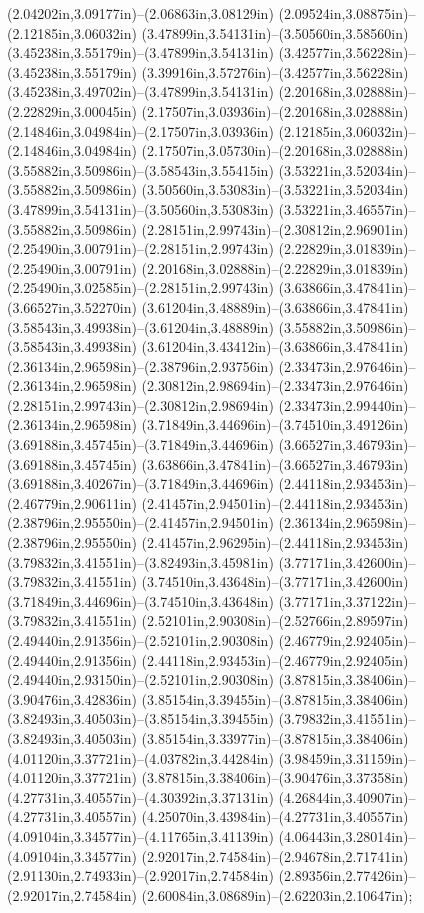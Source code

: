 (2.04202in,3.09177in)--(2.06863in,3.08129in) (2.09524in,3.08875in)--(2.12185in,3.06032in) (3.47899in,3.54131in)--(3.50560in,3.58560in) (3.45238in,3.55179in)--(3.47899in,3.54131in) (3.42577in,3.56228in)--(3.45238in,3.55179in) (3.39916in,3.57276in)--(3.42577in,3.56228in) (3.45238in,3.49702in)--(3.47899in,3.54131in) (2.20168in,3.02888in)--(2.22829in,3.00045in) (2.17507in,3.03936in)--(2.20168in,3.02888in) (2.14846in,3.04984in)--(2.17507in,3.03936in) (2.12185in,3.06032in)--(2.14846in,3.04984in) (2.17507in,3.05730in)--(2.20168in,3.02888in) (3.55882in,3.50986in)--(3.58543in,3.55415in) (3.53221in,3.52034in)--(3.55882in,3.50986in) (3.50560in,3.53083in)--(3.53221in,3.52034in) (3.47899in,3.54131in)--(3.50560in,3.53083in) (3.53221in,3.46557in)--(3.55882in,3.50986in) (2.28151in,2.99743in)--(2.30812in,2.96901in) (2.25490in,3.00791in)--(2.28151in,2.99743in) (2.22829in,3.01839in)--(2.25490in,3.00791in) (2.20168in,3.02888in)--(2.22829in,3.01839in) (2.25490in,3.02585in)--(2.28151in,2.99743in) (3.63866in,3.47841in)--(3.66527in,3.52270in) (3.61204in,3.48889in)--(3.63866in,3.47841in) (3.58543in,3.49938in)--(3.61204in,3.48889in) (3.55882in,3.50986in)--(3.58543in,3.49938in) (3.61204in,3.43412in)--(3.63866in,3.47841in) (2.36134in,2.96598in)--(2.38796in,2.93756in) (2.33473in,2.97646in)--(2.36134in,2.96598in) (2.30812in,2.98694in)--(2.33473in,2.97646in) (2.28151in,2.99743in)--(2.30812in,2.98694in) (2.33473in,2.99440in)--(2.36134in,2.96598in) (3.71849in,3.44696in)--(3.74510in,3.49126in) (3.69188in,3.45745in)--(3.71849in,3.44696in) (3.66527in,3.46793in)--(3.69188in,3.45745in) (3.63866in,3.47841in)--(3.66527in,3.46793in) (3.69188in,3.40267in)--(3.71849in,3.44696in) (2.44118in,2.93453in)--(2.46779in,2.90611in) (2.41457in,2.94501in)--(2.44118in,2.93453in) (2.38796in,2.95550in)--(2.41457in,2.94501in) (2.36134in,2.96598in)--(2.38796in,2.95550in) (2.41457in,2.96295in)--(2.44118in,2.93453in) (3.79832in,3.41551in)--(3.82493in,3.45981in) (3.77171in,3.42600in)--(3.79832in,3.41551in) (3.74510in,3.43648in)--(3.77171in,3.42600in) (3.71849in,3.44696in)--(3.74510in,3.43648in) (3.77171in,3.37122in)--(3.79832in,3.41551in) (2.52101in,2.90308in)--(2.52766in,2.89597in) (2.49440in,2.91356in)--(2.52101in,2.90308in) (2.46779in,2.92405in)--(2.49440in,2.91356in) (2.44118in,2.93453in)--(2.46779in,2.92405in) (2.49440in,2.93150in)--(2.52101in,2.90308in) (3.87815in,3.38406in)--(3.90476in,3.42836in) (3.85154in,3.39455in)--(3.87815in,3.38406in) (3.82493in,3.40503in)--(3.85154in,3.39455in) (3.79832in,3.41551in)--(3.82493in,3.40503in) (3.85154in,3.33977in)--(3.87815in,3.38406in) (4.01120in,3.37721in)--(4.03782in,3.44284in) (3.98459in,3.31159in)--(4.01120in,3.37721in) (3.87815in,3.38406in)--(3.90476in,3.37358in) (4.27731in,3.40557in)--(4.30392in,3.37131in) (4.26844in,3.40907in)--(4.27731in,3.40557in) (4.25070in,3.43984in)--(4.27731in,3.40557in) (4.09104in,3.34577in)--(4.11765in,3.41139in) (4.06443in,3.28014in)--(4.09104in,3.34577in) (2.92017in,2.74584in)--(2.94678in,2.71741in) (2.91130in,2.74933in)--(2.92017in,2.74584in) (2.89356in,2.77426in)--(2.92017in,2.74584in) (2.60084in,3.08689in)--(2.62203in,2.10647in);
